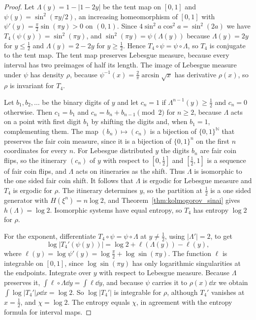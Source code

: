 \begin{proof}
Let $\Lambda(y) = 1-|1-2y|$ be the tent map on $[0,1]$ and $\psi(y) = \sin^2(\pi y/2)$, an increasing homeomorphism of $[0,1]$ with $\psi'(y) = \frac\pi2\sin(\pi y)>0$ on $(0,1)$. Since $4\sin^2a\cos^2a = \sin^2(2a)$ we have $T_4(\psi(y)) = \sin^2(\pi y)$, and $\sin^2(\pi y) = \psi(\Lambda(y))$ because $\Lambda(y) = 2y$ for $y\leq\frac12$ and $\Lambda(y) = 2-2y$ for $y\geq\frac12$. Hence $T_4\circ\psi = \psi\circ\Lambda$, so $T_4$ is conjugate to the tent map. The tent map preserves Lebesgue measure, because every interval has two preimages of half its length. The image of Lebesgue measure under $\psi$ has density $\rho$, because $\psi^{-1}(x) = \frac2\pi\arcsin\sqrt x$ has derivative $\rho(x)$, so $\rho$ is invariant for $T_4$.

Let $b_1,b_2,\dots$ be the binary digits of $y$ and let $c_n = 1$ if $\Lambda^{n-1}(y)\geq\frac12$ and $c_n = 0$ otherwise. Then $c_1 = b_1$ and $c_n = b_n+b_{n-1}\pmod 2$ for $n\geq2$, because $\Lambda$ acts on a point with first digit $b_1$ by shifting the digits and, when $b_1 = 1$, complementing them. The map $(b_n)\mapsto(c_n)$ is a bijection of $\{0,1\}^{\mathbb{N}}$ that preserves the fair coin measure, since it is a bijection of $\{0,1\}^n$ on the first $n$ coordinates for every $n$. For Lebesgue distributed $y$ the digits $b_n$ are fair coin flips, so the itinerary $(c_n)$ of $y$ with respect to $[0,\frac12]$ and $[\frac12,1]$ is a sequence of fair coin flips, and $\Lambda$ acts on itineraries as the shift. Thus $\Lambda$ is isomorphic to the one sided fair coin shift. It follows that $\Lambda$ is ergodic for Lebesgue measure and $T_4$ is ergodic for $\rho$. The itinerary determines $y$, so the partition at $\frac12$ is a one sided generator with $H(\xi^n) = n\log2$, and Theorem~\ref{thm:kolmogorov_sinai} gives $h(\Lambda) = \log2$. Isomorphic systems have equal entropy, so $T_4$ has entropy $\log2$ for $\rho$.

For the exponent, differentiate $T_4\circ\psi = \psi\circ\Lambda$ at $y\neq\frac12$, using $|\Lambda'| = 2$, to get
\[
\log|T_4'(\psi(y))| = \log2+\ell(\Lambda(y))-\ell(y),
\]
where $\ell(y) = \log\psi'(y) = \log\frac\pi2+\log\sin(\pi y)$. The function $\ell$ is integrable on $[0,1]$, since $\log\sin(\pi y)$ has only logarithmic singularities at the endpoints. Integrate over $y$ with respect to Lebesgue measure. Because $\Lambda$ preserves it, $\int\ell\circ\Lambda\dd y = \int\ell\dd y$, and because $\psi$ carries it to $\rho(x)\dd x$ we obtain $\int\log|T_4'|\rho\dd x = \log2$. So $\log|T_4'|$ is integrable for $\rho$, although $T_4'$ vanishes at $x = \frac12$, and $\chi = \log2$. The entropy equals $\chi$, in agreement with the entropy formula for interval maps.
\end{proof}

